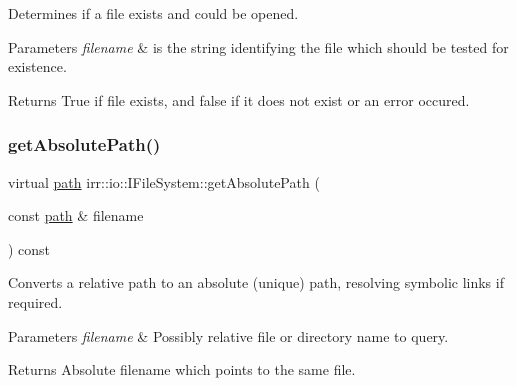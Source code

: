 Determines if a file exists and could be opened. 


\begin{DoxyParams}{Parameters}
{\em filename} & is the string identifying the file which should be tested for existence. \\
\hline
\end{DoxyParams}
\begin{DoxyReturn}{Returns}
True if file exists, and false if it does not exist or an error occured. 
\end{DoxyReturn}
\mbox{\label{classirr_1_1io_1_1IFileSystem_a77191d7917349a0200f5de3ef29acd18}} 
\subsubsection{\texorpdfstring{get\+Absolute\+Path()}{getAbsolutePath()}}
{\footnotesize\ttfamily virtual \hyperlink{namespaceirr_1_1io_ab1bdc45edb3f94d8319c02bc0f840ee1}{path} irr\+::io\+::\+I\+File\+System\+::get\+Absolute\+Path (\begin{DoxyParamCaption}\item[{const \hyperlink{namespaceirr_1_1io_ab1bdc45edb3f94d8319c02bc0f840ee1}{path} \&}]{filename }\end{DoxyParamCaption}) const\hspace{0.3cm}{\ttfamily [pure virtual]}}



Converts a relative path to an absolute (unique) path, resolving symbolic links if required. 


\begin{DoxyParams}{Parameters}
{\em filename} & Possibly relative file or directory name to query. \\
\hline
\end{DoxyParams}
\begin{DoxyReturn}{Returns}
Absolute filename which points to the same file. 
\end{DoxyReturn}
\mbox{\label{classirr_1_1io_1_1IFileSystem_a175208d74556d1a0e4fe7400bbc65d7b}} 
